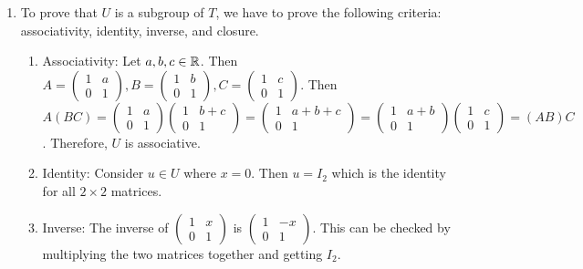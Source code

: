 \documentclass[12pt]{report}
\begin{document}
\begin{enumerate}[label=\alph*.]
    \item To prove that $U$ is a subgroup of $T$, we have to prove the following criteria: associativity, identity, inverse, and closure. 
    \begin{enumerate}
        \item Associativity: Let $a,b,c \in \RR$. Then $A = \begin{pmatrix}
            1 & a \\
            0 & 1
        \end{pmatrix}, B = \begin{pmatrix}
            1 & b \\
            0 & 1
        \end{pmatrix}, C = \begin{pmatrix}
            1 & c \\
            0 & 1
        \end{pmatrix}$. Then $A(BC) = \begin{pmatrix} 1 & a \\ 0 & 1 \end{pmatrix}\begin{pmatrix}
            1 & b + c \\
            0 & 1
        \end{pmatrix} = \begin{pmatrix}
            1 & a + b + c \\
            0 & 1
        \end{pmatrix} = \begin{pmatrix} 1 & a + b \\ 0 & 1 \end{pmatrix}\begin{pmatrix} 1 & c \\ 0 & 1 \end{pmatrix} = (AB)C$. Therefore, $U$ is associative.
        \item Identity: Consider $u \in U$ where $x = 0$. Then $u = I_2$ which is the identity for all $2 \times 2$ matrices.
        \item Inverse: The inverse of $\begin{pmatrix}
            1 & x \\
            0 & 1
        \end{pmatrix}$ is $\begin{pmatrix}
            1 & -x \\
            0 & 1\end{pmatrix}$. This can be checked by multiplying the two matrices together and getting $I_2$.

\end{enumerate}
\end{enumerate}
\end{document}
